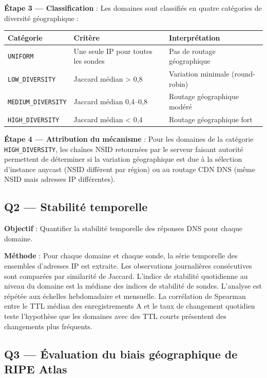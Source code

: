 \textbf{Étape 3 --- Classification} : Les domaines sont classifiés en quatre catégories de diversité géographique :

\begin{table}[H]
\centering
\small
\begin{tabular}{l l l}
\toprule
\textbf{Catégorie} & \textbf{Critère} & \textbf{Interprétation} \\
\midrule
\texttt{UNIFORM} & Une seule IP pour toutes les sondes & Pas de routage géographique \\
\texttt{LOW\_DIVERSITY} & Jaccard médian > 0,8 & Variation minimale (round-robin) \\
\texttt{MEDIUM\_DIVERSITY} & Jaccard médian 0,4--0,8 & Routage géographique modéré \\
\texttt{HIGH\_DIVERSITY} & Jaccard médian < 0,4 & Routage géographique fort \\
\bottomrule
\end{tabular}
\end{table}

\textbf{Étape 4 --- Attribution du mécanisme} : Pour les domaines de la catégorie \texttt{HIGH\_DIVERSITY}, les chaînes NSID retournées par le serveur faisant autorité permettent de déterminer si la variation géographique est due à la sélection d'instance anycast (NSID différent par région) ou au routage CDN DNS (même NSID mais adresses IP différentes).

\subsection{Q2 --- Stabilité temporelle}
\label{subsec:3.5.2}

\textbf{Objectif} : Quantifier la stabilité temporelle des réponses DNS pour chaque domaine.

\textbf{Méthode} : Pour chaque domaine et chaque sonde, la série temporelle des ensembles d'adresses IP est extraite. Les observations journalières consécutives sont comparées par similarité de Jaccard. L'indice de stabilité quotidienne au niveau du domaine est la médiane des indices de stabilité de sondes. L'analyse est répétée aux échelles hebdomadaire et mensuelle. La corrélation de Spearman entre le TTL médian des enregistrements A et le taux de changement quotidien teste l'hypothèse que les domaines avec des TTL courts présentent des changements plus fréquents.

\subsection{Q3 --- Évaluation du biais géographique de RIPE Atlas}
\label{subsec:3.5.3}

